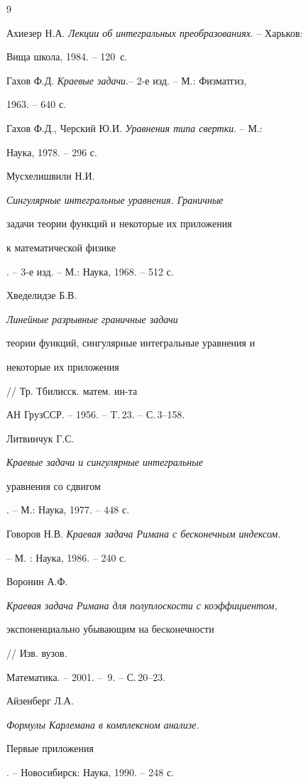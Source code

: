 \begin{thebibliography}{9}







Ахиезер Н.А. {\em Лекции об интегральных преобразованиях}. -- Харьков:


Вища школа, 1984. -- 120~с.




Гахов Ф.Д. {\em Краевые задачи}.-- 2-е изд. -- М.: Физматгиз,


1963. -- 640 с.




Гахов Ф.Д., Черский Ю.И. {\em Уравнения типа свертки}. -- М.:


Наука, 1978. -- 296 с.




Мусхелишвили Н.И. {\em Сингулярные интегральные уравнения. Граничные 


задачи теории функций и некоторые их приложения 


к математической физике}. -- 3-е изд. -- М.: Наука, 1968. -- 512 с.




Хведелидзе Б.В. {\em Линейные разрывные граничные задачи


теории функций, сингулярные интегральные уравнения и


некоторые их приложения} // Тр. Тбилисск. матем. ин-та


АН ГрузССР. -- 1956. -- T.\,23. -- С.\,3--158.




Литвинчук Г.С. {\em Краевые задачи и сингулярные интегральные


уравнения со сдвигом}. -- М.: Наука, 1977. -- 448 с.




Говоров Н.В. {\em Краевая задача Римана с бесконечным индексом}.


-- М. : Наука, 1986. -- 240 с.




Воронин А.Ф. {\em Краевая задача Римана для полуплоскости с коэффициентом,


экспоненциально убывающим на бесконечности} // Изв. вузов.


Математика. -- 2001. -- \No\,9. -- С.\,20--23.




Айзенберг Л.А. {\em Формулы Карлемана в комплексном анализе.


Первые приложения}. -- Новосибирск: Наука, 1990. -- 248 с.





\end{thebibliography}





